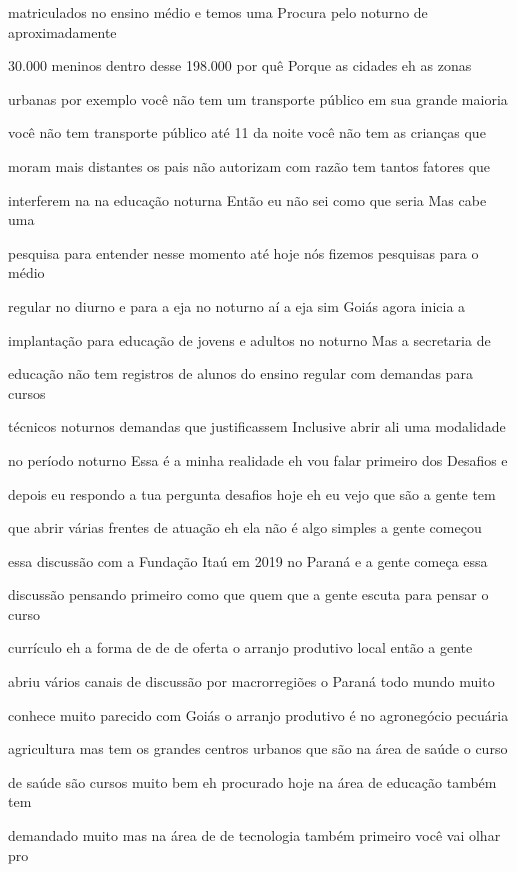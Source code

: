 \documentclass[a4paper,12pt]{article}
\begin{document}
matriculados no ensino médio e temos uma Procura pelo noturno de aproximadamente

30.000 meninos dentro desse 198.000 por quê Porque as cidades eh as zonas

urbanas por exemplo você não tem um transporte público em sua grande maioria

você não tem transporte público até 11 da noite você não tem as crianças que

moram mais distantes os pais não autorizam com razão tem tantos fatores que

interferem na na educação noturna Então eu não sei como que seria Mas cabe uma

pesquisa para entender nesse momento até hoje nós fizemos pesquisas para o médio

regular no diurno e para a eja no noturno aí a eja sim Goiás agora inicia a

implantação para educação de jovens e adultos no noturno Mas a secretaria de

educação não tem registros de alunos do ensino regular com demandas para cursos

técnicos noturnos demandas que justificassem Inclusive abrir ali uma modalidade

no período noturno Essa é a minha realidade eh vou falar primeiro dos Desafios e

depois eu respondo a tua pergunta desafios hoje eh eu vejo que são a gente tem

que abrir várias frentes de atuação eh ela não é algo simples a gente começou

essa discussão com a Fundação Itaú em 2019 no Paraná e a gente começa essa

discussão pensando primeiro como que quem que a gente escuta para pensar o curso

currículo eh a forma de de de oferta o arranjo produtivo local então a gente

abriu vários canais de discussão por macrorregiões o Paraná todo mundo muito

conhece muito parecido com Goiás o arranjo produtivo é no agronegócio pecuária

agricultura mas tem os grandes centros urbanos que são na área de saúde o curso

de saúde são cursos muito bem eh procurado hoje na área de educação também tem

demandado muito mas na área de de tecnologia também primeiro você vai olhar pro
\end{document}
